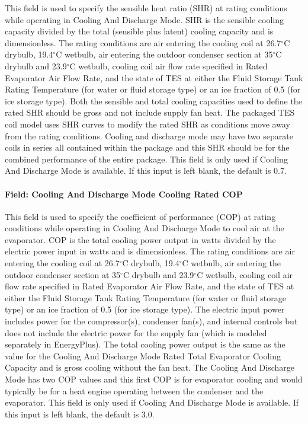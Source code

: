 This field is used to specify the sensible heat ratio (SHR) at rating conditions while operating in Cooling And Discharge Mode. SHR is the sensible cooling capacity divided by the total (sensible plus latent) cooling capacity and is dimensionless. The rating conditions are air entering the cooling coil at 26.7$^\circ$C drybulb, 19.4$^\circ$C wetbulb, air entering the outdoor condenser section at 35$^\circ$C drybulb and 23.9$^\circ$C wetbulb, cooling coil air flow rate specified in Rated Evaporator Air Flow Rate, and the state of TES at either the Fluid Storage Tank Rating Temperature (for water or fluid storage type) or an ice fraction of 0.5 (for ice storage type). Both the sensible and total cooling capacities used to define the rated SHR should be gross and not include supply fan heat. The packaged TES coil model uses SHR curves to modify the rated SHR as conditions move away from the rating conditions. Cooling and discharge mode may have two separate coils in series all contained within the package and this SHR should be for the combined performance of the entire package. This field is only used if Cooling And Discharge Mode is available. If this input is left blank, the default is 0.7.

\paragraph{Field: Cooling And Discharge Mode Cooling Rated COP}\label{field-cooling-and-discharge-mode-cooling-rated-cop}

This field is used to specify the coefficient of performance (COP) at rating conditions while operating in Cooling And Discharge Mode to cool air at the evaporator. COP is the total cooling power output in watts divided by the electric power input in watts and is dimensionless. The rating conditions are air entering the cooling coil at 26.7$^\circ$C drybulb, 19.4$^\circ$C wetbulb, air entering the outdoor condenser section at 35$^\circ$C drybulb and 23.9$^\circ$C wetbulb, cooling coil air flow rate specified in Rated Evaporator Air Flow Rate, and the state of TES at either the Fluid Storage Tank Rating Temperature (for water or fluid storage type) or an ice fraction of 0.5 (for ice storage type). The electric input power includes power for the compressor(s), condenser fan(s), and internal controls but does not include the electric power for the supply fan (which is modeled separately in EnergyPlus). The total cooling power output is the same as the value for the Cooling And Discharge Mode Rated Total Evaporator Cooling Capacity and is gross cooling without the fan heat. The Cooling And Discharge Mode has two COP values and this first COP is for evaporator cooling and would typically be for a heat engine operating between the condenser and the evaporator. This field is only used if Cooling And Discharge Mode is available. If this input is left blank, the default is 3.0.

